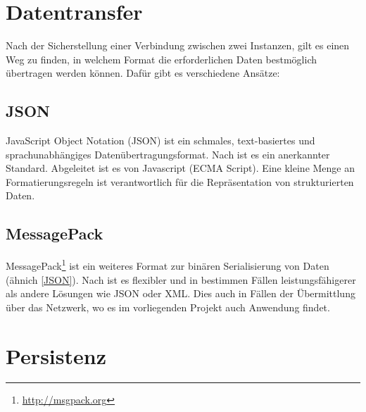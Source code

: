 \section{Datentransfer}\label{literatur-datentransfer}


Nach der Sicherstellung einer Verbindung zwischen zwei Instanzen, gilt es einen Weg zu finden, in welchem Format die erforderlichen Daten bestmöglich übertragen werden können. Dafür gibt es verschiedene Ansätze:


\subsection{JSON}\label{JSON}

   JavaScript Object Notation (JSON) ist ein schmales, text-basiertes und sprachunabhängiges Datenübertragungsformat. Nach \cite{bray2014json} ist es ein anerkannter Standard. Abgeleitet ist es von Javascript (ECMA Script). Eine kleine Menge an Formatierungsregeln ist verantwortlich für die Repräsentation von strukturierten Daten.
   
   

\subsection{MessagePack}


MessagePack\footnote{\url{http://msgpack.org}} ist ein weiteres Format zur binären Serialisierung von Daten (ähnich \autoref{JSON}). Nach \cite{izzo2016biomedical} ist es flexibler und in bestimmen Fällen leistungsfähigerer als andere Lösungen wie JSON oder XML. Dies auch in Fällen der Übermittlung über das Netzwerk, wo es im vorliegenden Projekt auch Anwendung findet.




\section{Persistenz}\label{s-persistenz}


